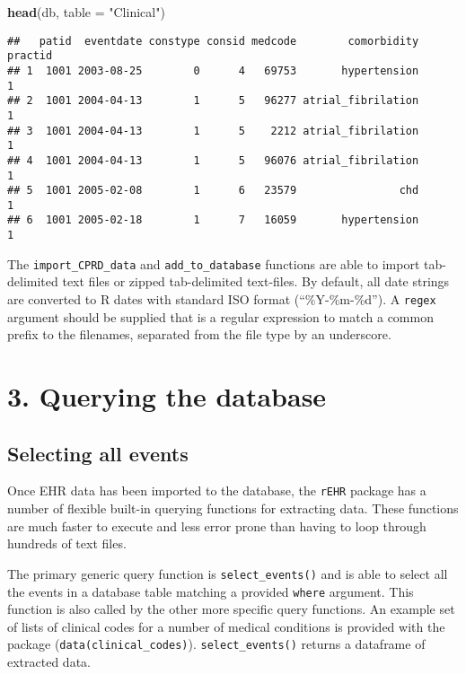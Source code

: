 \documentclass[]{article}
\newenvironment{Shaded}{\begin{snugshade}}{\end{snugshade}}
\newcommand{\KeywordTok}[1]{\textcolor[rgb]{0.13,0.29,0.53}{\textbf{{#1}}}}
\newcommand{\DataTypeTok}[1]{\textcolor[rgb]{0.13,0.29,0.53}{{#1}}}
\newcommand{\StringTok}[1]{\textcolor[rgb]{0.31,0.60,0.02}{{#1}}}
\newcommand{\NormalTok}[1]{{#1}}
\begin{document}
\begin{Shaded}
\begin{Highlighting}[]
\KeywordTok{head}\NormalTok{(db, }\DataTypeTok{table =} \StringTok{"Clinical"}\NormalTok{)}
\end{Highlighting}
\end{Shaded}

\begin{verbatim}
##   patid  eventdate constype consid medcode        comorbidity practid
## 1  1001 2003-08-25        0      4   69753       hypertension       1
## 2  1001 2004-04-13        1      5   96277 atrial_fibrilation       1
## 3  1001 2004-04-13        1      5    2212 atrial_fibrilation       1
## 4  1001 2004-04-13        1      5   96076 atrial_fibrilation       1
## 5  1001 2005-02-08        1      6   23579                chd       1
## 6  1001 2005-02-18        1      7   16059       hypertension       1
\end{verbatim}

The \texttt{import\_CPRD\_data} and \texttt{add\_to\_database} functions
are able to import tab-delimited text files or zipped tab-delimited
text-files. By default, all date strings are converted to R dates with
standard ISO format (``\%Y-\%m-\%d''). A \texttt{regex} argument should
be supplied that is a regular expression to match a common prefix to the
filenames, separated from the file type by an underscore.

\section{3. Querying the database}\label{querying-the-database}

\subsection{Selecting all events}\label{selecting-all-events}

Once EHR data has been imported to the database, the \texttt{rEHR}
package has a number of flexible built-in querying functions for
extracting data. These functions are much faster to execute and less
error prone than having to loop through hundreds of text files.

The primary generic query function is \texttt{select\_events()} and is
able to select all the events in a database table matching a provided
\texttt{where} argument. This function is also called by the other more
specific query functions. An example set of lists of clinical codes for
a number of medical conditions is provided with the package
(\texttt{data(clinical\_codes)}). \texttt{select\_events()} returns a
dataframe of extracted data.
\end{document}
